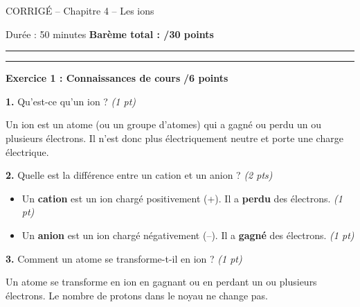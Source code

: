 \documentclass[11pt,a4paper]{article}
\begin{document}
	
	\begin{center}
		\LARGE{CORRIGÉ -- Chapitre 4 -- Les ions}
		
		\vspace{3mm}
		
		\large{Durée : 50 minutes \hspace{1cm} \textbf{Barème total : /30 points}}
	\end{center}
	
	\normalsize
	
	\hrule
	
	
	\vspace{3mm}
	
	\hrule
	\vspace{3mm}
	
	\textbf{Exercice 1 : Connaissances de cours} \hfill \textbf{/6 points}
	
	\vspace{3mm}
	
	\textbf{1.} Qu'est-ce qu'un ion ? \hfill \textit{(1 pt)}
	
	\begin{tcolorbox}[colback=green!5!white,colframe=green!75!black]
		Un ion est un atome (ou un groupe d'atomes) qui a gagné ou perdu un ou plusieurs électrons. Il n'est donc plus électriquement neutre et porte une charge électrique.
	\end{tcolorbox}
	
	\vspace{3mm}
	
	\textbf{2.} Quelle est la différence entre un cation et un anion ? \hfill \textit{(2 pts)}
	
	\begin{tcolorbox}[colback=green!5!white,colframe=green!75!black]
		\begin{itemize}
			\item Un \textbf{cation} est un ion chargé positivement (+). Il a \textbf{perdu} des électrons. \textit{(1 pt)}
			\item Un \textbf{anion} est un ion chargé négativement (--). Il a \textbf{gagné} des électrons. \textit{(1 pt)}
		\end{itemize}
	\end{tcolorbox}
	
	\vspace{3mm}
	
	\textbf{3.} Comment un atome se transforme-t-il en ion ? \hfill \textit{(1 pt)}
	
	\begin{tcolorbox}[colback=green!5!white,colframe=green!75!black]
		Un atome se transforme en ion en gagnant ou en perdant un ou plusieurs électrons. Le nombre de protons dans le noyau ne change pas.
	\end{tcolorbox}
	
\end{document}
